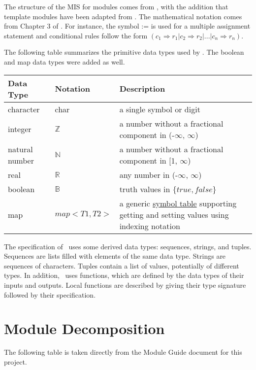 \documentclass[12pt, titlepage]{article}
\begin{document}
The structure of the MIS for modules comes from \citet{HoffmanAndStrooper1995},
with the addition that template modules have been adapted from
\cite{GhezziEtAl2003}.  The mathematical notation comes from Chapter 3 of
\citet{HoffmanAndStrooper1995}.  For instance, the symbol := is used for a
multiple assignment statement and conditional rules follow the form $(c_1
\Rightarrow r_1 | c_2 \Rightarrow r_2 | ... | c_n \Rightarrow r_n )$.

The following table summarizes the primitive data types used by \progname. The boolean and map data types were added as well.

\begin{center}
\renewcommand{\arraystretch}{1.2}
\noindent 
\begin{tabular}{l l p{7.5cm}} 
\toprule 
\textbf{Data Type} & \textbf{Notation} & \textbf{Description}\\ 
\midrule
character & char & a single symbol or digit\\
integer & $\mathbb{Z}$ & a number without a fractional component in (-$\infty$, $\infty$) \\
natural number & $\mathbb{N}$ & a number without a fractional component in [1, $\infty$) \\
real & $\mathbb{R}$ & any number in (-$\infty$, $\infty$)\\
boolean & $\mathbb{B}$ & truth values in $\{true, false\}$\\
map &  $map<T1, T2>$ & a generic \href{https://en.wikipedia.org/wiki/Symbol_table}{symbol table} supporting getting and setting values using indexing notation\\
\bottomrule
\end{tabular} 
\end{center}

\noindent
The specification of \progname \ uses some derived data types: sequences, strings, and
tuples. Sequences are lists filled with elements of the same data type. Strings
are sequences of characters. Tuples contain a list of values, potentially of
different types. In addition, \progname \ uses functions, which
are defined by the data types of their inputs and outputs. Local functions are
described by giving their type signature followed by their specification.

\section{Module Decomposition}

The following table is taken directly from the Module Guide document for this project.
\end{document}
